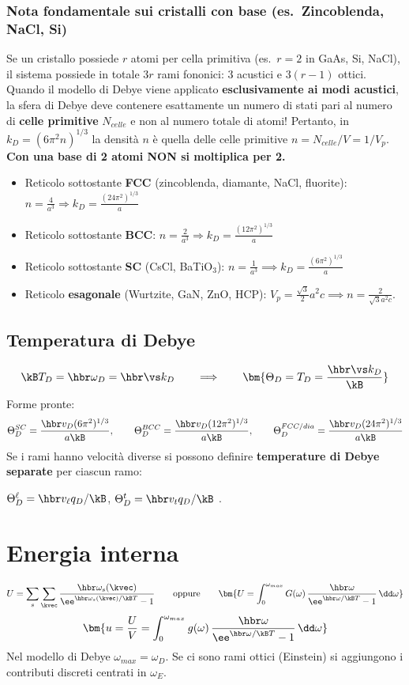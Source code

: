 \subsubsection*{Nota fondamentale sui cristalli con base (es.\ Zincoblenda, NaCl, Si)}
Se un cristallo possiede $r$ atomi per cella primitiva (es.\ $r=2$ in GaAs, Si, NaCl), il sistema possiede in totale $3r$ rami fononici: $3$ acustici e $3(r-1)$ ottici. Quando il modello di Debye viene applicato \textbf{esclusivamente ai modi acustici}, la sfera di Debye deve contenere esattamente un numero di stati pari al numero di \textbf{celle primitive} $N_{celle}$ e non al numero totale di atomi!
Pertanto, in $k_D = (6\pi^2 n)^{1/3}$ la densità $n$ è quella delle celle primitive $n = N_{celle}/V = 1/V_p$. \textbf{Con una base di 2 atomi NON si moltiplica per 2.}
\begin{itemize}
    \item Reticolo sottostante \textbf{FCC} (zincoblenda, diamante, NaCl, fluorite): $n = \frac{4}{a^3} \Rightarrow k_D = \frac{(24\pi^2)^{1/3}}{a}$
    \item Reticolo sottostante \textbf{BCC}: $n = \frac{2}{a^3} \Rightarrow k_D = \frac{(12\pi^2)^{1/3}}{a}$
    \item Reticolo sottostante \textbf{SC} (CsCl, BaTiO$_3$): $n = \frac{1}{a^3} \implies k_D = \frac{(6\pi^2)^{1/3}}{a} $
    \item Reticolo \textbf{esagonale} (Wurtzite, GaN, ZnO, HCP): $V_p = \frac{\sqrt3}{2}a^2c \implies n = \frac{2}{\sqrt3 a^2 c}$.
   
\end{itemize}

\subsection{Temperatura di Debye}
\[ \kB T_D = \hbr\omega_D = \hbr \vs k_D \qquad\Longrightarrow\qquad \bm{\Theta_D = T_D = \frac{\hbr \vs k_D}{\kB}} \]
Forme pronte:
\[ \Theta_D^{SC} = \frac{\hbr v_D (6\pi^2)^{1/3}}{a\kB}, \qquad
   \Theta_D^{BCC} = \frac{\hbr v_D (12\pi^2)^{1/3}}{a\kB}, \qquad
   \Theta_D^{FCC/dia} = \frac{\hbr v_D (24\pi^2)^{1/3}}{a\kB} \]
Se i rami hanno velocità diverse si possono definire \textbf{temperature di Debye separate} per ciascun ramo:

$\Theta_D^{\ell} = \hbr v_\ell q_D/\kB$, $\Theta_D^{t}=\hbr v_t q_D/\kB$ .

\newpage

\section{Energia interna}
\[ U = \sum_{s}\sum_{\kvec} \frac{\hbr\omega_s(\kvec)}{\ee^{\hbr\omega_s(\kvec)/\kB T}-1}
   \qquad\text{oppure}\qquad
   \bm{U = \int_0^{\omega_{max}} G(\omega)\,\frac{\hbr\omega}{\ee^{\hbr\omega/\kB T}-1}\,\dd\omega} \]
\[ \bm{u = \frac{U}{V} = \int_0^{\omega_{max}} g(\omega)\,\frac{\hbr\omega}{\ee^{\hbr\omega/\kB T}-1}\,\dd\omega} \]
Nel modello di Debye $\omega_{max}=\omega_D$. Se ci sono rami ottici (Einstein) si aggiungono i contributi discreti centrati in $\omega_E$.

